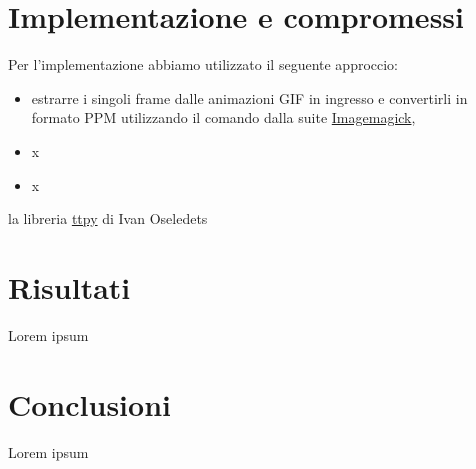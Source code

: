 \documentclass[11pt,a4paper]{article}
\begin{document}
\section{Implementazione e compromessi}
Per l'implementazione abbiamo utilizzato il seguente approccio:
\begin{itemize}
\item estrarre i singoli frame dalle animazioni GIF in ingresso e convertirli in formato PPM utilizzando il comando  dalla suite \href{http://www.imagemagick.org/}{Imagemagick},
\item x
\item x
\end{itemize}
la libreria \href{https://github.com/oseledets/ttpy}{ttpy} di Ivan Oseledets

\section{Risultati}
Lorem ipsum

\section{Conclusioni}
Lorem ipsum


\end{document}
